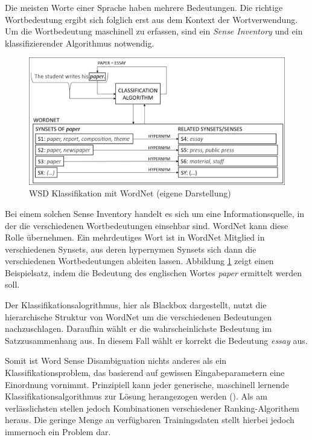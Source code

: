 Die meisten Worte einer Sprache haben mehrere Bedeutungen. Die richtige Wortbedeutung ergibt sich folglich erst aus dem Kontext der Wortverwendung. Um die Wortbedeutung maschinell zu erfassen, sind ein \textit{Sense Inventory} und ein klassifizierender Algorithmus notwendig. 
\begin{figure}[H]
\begin{center}
\includegraphics[keepaspectratio=true, width=\textwidth]{pictures/WSD.png}
\caption{WSD Klassifikation mit WordNet (eigene Darstellung)}
\label{fig:WSD}
\end{center}
\end{figure}
Bei einem solchen Sense Inventory handelt es sich um eine Informationsquelle, in der die verschiedenen Wortbedeutungen einsehbar sind. WordNet kann diese Rolle übernehmen. Ein mehrdeutiges Wort ist in WordNet Mitglied in verschiedenen Synsets, aus deren hypernymen Synsets sich dann die verschiedenen Wortbedeutungen ableiten lassen. Abbildung \ref{fig:WSD} zeigt einen Beispielsatz, indem die Bedeutung des englischen Wortes \textit{paper} ermittelt werden soll.
\par 
Der Klassifikationsalogrithmus, hier als Blackbox dargestellt, nutzt die hierarchische Struktur von WordNet um die verschiedenen Bedeutungen nachzuschlagen. Daraufhin wählt er die wahrscheinlichste Bedeutung im Satzzusammenhang aus. In diesem Fall wählt er korrekt die Bedeutung \textit{essay} aus.
\par
Somit ist Word Sense Disambiguation nichts anderes als ein Klassifikationsproblem, das basierend auf gewissen Eingabeparametern eine Einordnung vornimmt. Prinzipiell kann jeder generische, maschinell lernende Klassifikationsalgorithmus zur Lösung herangezogen werden (\cite[vgl.][326]{YAROWSKY}). Als am verlässlichsten stellen jedoch Kombinationen verschiedener Ranking-Algorithem heraus. Die geringe Menge an verfügbaren Trainingsdaten stellt hierbei jedoch immernoch ein Problem dar.


